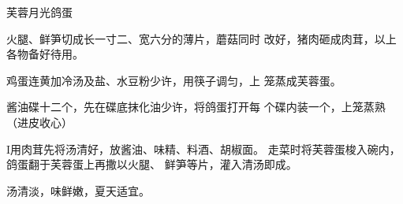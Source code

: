 \begin{recipe}{芙蓉月光鸽蛋}

\ingredients


\cooking

\step 火腿、鲜笋切成长一寸二、宽六分的薄片，蘑菇同时 改好，猪肉砸成肉茸，以上各物备好待用。

\step 鸡蛋连黄加冷汤及盐、水豆粉少许，用筷子调匀，上 笼蒸成芙蓉蛋。

\step 酱油碟十二个，先在碟底抹化油少许，将鸽蛋打开每 个碟内装一个，上笼蒸熟（进皮收心）

I用肉茸先将汤清好，放酱油、味精、料酒、胡椒面。 走菜时将芙蓉蛋梭入碗内，鸽蛋翻于芙蓉蛋上再撒以火腿、 鲜笋等片，灌入清汤即成。

\notes

汤清淡，味鲜嫩，夏天适宜。

\end{recipe}

